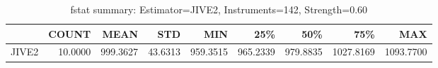 \begin{table}[ht]
\centering
\caption{fstat summary: Estimator=JIVE2, Instruments=142, Strength=0.60}
\begin{tabular}{lrrrrrrrr}
\toprule
 & COUNT & MEAN & STD & MIN & 25\% & 50\% & 75\% & MAX \\
\midrule
JIVE2 & 10.0000 & 999.3627 & 43.6313 & 959.3515 & 965.2339 & 979.8835 & 1027.8169 & 1093.7700 \\
\bottomrule
\end{tabular}
\end{table}
